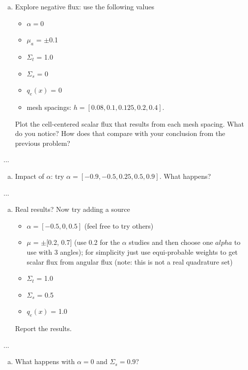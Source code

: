 \documentclass[10pt]{article}
\begin{document}
\begin{enumerate}[(a)]
\item Explore negative flux: use the following values
\begin{itemize}
\setlength\itemsep{0em}
\item $\alpha = 0$
\item $\mu_a$ = $\pm$0.1
\item $\Sigma_t$ = 1.0
\item $\Sigma_s$ = 0
\item $q_e(x)$ = 0
\item mesh spacings: $h = [0.08, 0.1, 0.125, 0.2, 0.4]$.
\end{itemize}
Plot the cell-centered scalar flux that results from each mesh spacing. What do you notice? How does that compare with your conclusion from the previous problem?
\end{enumerate}

...



\begin{enumerate}[(b)]
\item Impact of $\alpha$: try $\alpha = [-0.9, -0.5, 0.25, 0.5, 0.9]$. What happens?
\end{enumerate}

...



\begin{enumerate}[(c)]
\item Real results? Now try adding a source
\begin{itemize}
\setlength\itemsep{0em}
\item $\alpha = [-0.5, 0, 0.5]$ (feel free to try others)
\item $\mu$ = $\pm$[0.2, 0.7] (use 0.2 for the $\alpha$ studies and then choose one $alpha$ to use with 3 angles); for simplicity just use equi-probable weights to get scalar flux from angular flux (note: this is not a real quadrature set)
\item $\Sigma_t$ = 1.0
\item $\Sigma_s$ = 0.5
\item $q_e(x)$ = 1.0
\end{itemize}
Report the results.
\end{enumerate}

...



\begin{enumerate}[(d)]
\item What happens with $\alpha = 0$ and $\Sigma_s = 0.9$?
\end{enumerate}
\end{document}
